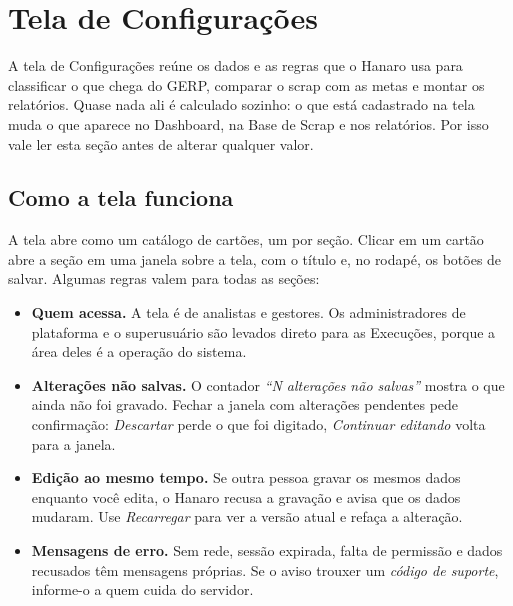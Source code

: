 \section{Tela de Configurações}\label{sec:configuracoes}

A tela de Configurações reúne os dados e as regras que o Hanaro usa para classificar o que chega do GERP, comparar o scrap com as metas e montar os relatórios. Quase nada ali é calculado sozinho: o que está cadastrado na tela muda o que aparece no Dashboard, na Base de Scrap e nos relatórios. Por isso vale ler esta seção antes de alterar qualquer valor.

\subsection{Como a tela funciona}

A tela abre como um catálogo de cartões, um por seção. Clicar em um cartão abre a seção em uma janela sobre a tela, com o título e, no rodapé, os botões de salvar. Algumas regras valem para todas as seções:

\begin{itemize}[leftmargin=1.6em,itemsep=0.2em,topsep=0.3em]
\item \textbf{Quem acessa.} A tela é de analistas e gestores. Os administradores de plataforma e o superusuário são levados direto para as Execuções, porque a área deles é a operação do sistema.
\item \textbf{Alterações não salvas.} O contador \emph{“N alterações não salvas”} mostra o que ainda não foi gravado. Fechar a janela com alterações pendentes pede confirmação: \emph{Descartar} perde o que foi digitado, \emph{Continuar editando} volta para a janela.
\item \textbf{Edição ao mesmo tempo.} Se outra pessoa gravar os mesmos dados enquanto você edita, o Hanaro recusa a gravação e avisa que os dados mudaram. Use \emph{Recarregar} para ver a versão atual e refaça a alteração.
\item \textbf{Mensagens de erro.} Sem rede, sessão expirada, falta de permissão e dados recusados têm mensagens próprias. Se o aviso trouxer um \emph{código de suporte}, informe-o a quem cuida do servidor.
\end{itemize}

